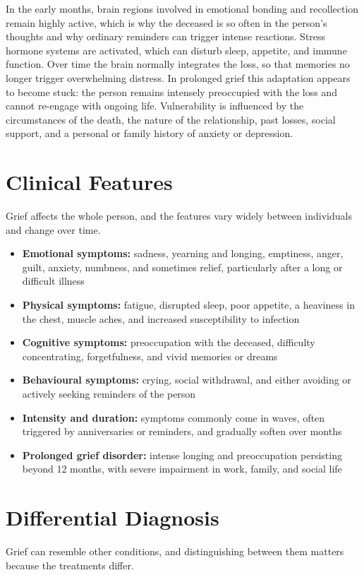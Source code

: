 In the early months, brain regions involved in emotional bonding and recollection remain highly active, which is why the deceased is so often in the person's thoughts and why ordinary reminders can trigger intense reactions. Stress hormone systems are activated, which can disturb sleep, appetite, and immune function. Over time the brain normally integrates the loss, so that memories no longer trigger overwhelming distress. In prolonged grief this adaptation appears to become stuck: the person remains intensely preoccupied with the loss and cannot re-engage with ongoing life. Vulnerability is influenced by the circumstances of the death, the nature of the relationship, past losses, social support, and a personal or family history of anxiety or depression.

\section*{Clinical Features}
Grief affects the whole person, and the features vary widely between individuals and change over time.

\begin{itemize}
    \item \textbf{Emotional symptoms:} sadness, yearning and longing, emptiness, anger, guilt, anxiety, numbness, and sometimes relief, particularly after a long or difficult illness
    \item \textbf{Physical symptoms:} fatigue, disrupted sleep, poor appetite, a heaviness in the chest, muscle aches, and increased susceptibility to infection
    \item \textbf{Cognitive symptoms:} preoccupation with the deceased, difficulty concentrating, forgetfulness, and vivid memories or dreams
    \item \textbf{Behavioural symptoms:} crying, social withdrawal, and either avoiding or actively seeking reminders of the person
    \item \textbf{Intensity and duration:} symptoms commonly come in waves, often triggered by anniversaries or reminders, and gradually soften over months
    \item \textbf{Prolonged grief disorder:} intense longing and preoccupation persisting beyond 12 months, with severe impairment in work, family, and social life
\end{itemize}

\section*{Differential Diagnosis}
Grief can resemble other conditions, and distinguishing between them matters because the treatments differ.

